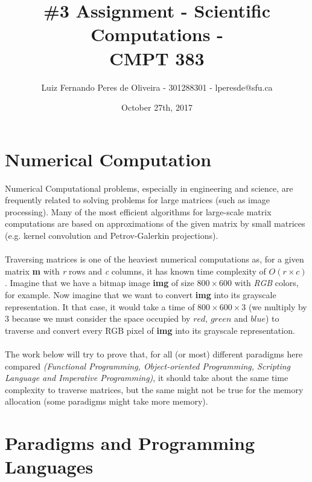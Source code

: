 \documentclass[conference]{IEEEtran}
\title{\#3 Assignment - Scientific Computations -\\ CMPT 383}
\author{Luiz Fernando Peres de Oliveira - 301288301 - lperesde@sfu.ca}
\date{October 27th, 2017}
\begin{document}
\maketitle

\section{Numerical Computation}
Numerical Computational problems, especially in engineering and science, are frequently related to solving problems for large matrices (such as image processing). Many of the most efficient algorithms for large-scale matrix computations are based on approximations of the given matrix by small matrices (e.g. kernel convolution and Petrov-Galerkin projections).
\\\\
Traversing matrices is one of the heaviest numerical computations as, for a given matrix \textbf{m} with \textit{r} rows and \textit{c} columns, it has known time complexity of $O(r\times c)$. Imagine that we have a bitmap image \textbf{img} of size $800 \times 600$ with \textit{RGB} colors, for example. Now imagine that we want to convert \textbf{img} into its grayscale representation.  It that case, it would take a time of $800 \times 600 \times 3$ (we multiply by 3 because we must consider the space occupied by $red$, $green$ and $blue$) to traverse and convert every RGB pixel of \textbf{img} into its grayscale representation.
\\\\
The work below will try to prove that, for all (or most) different paradigms here compared \textit{(Functional Programming, Object-oriented Programming, Scripting Language and Imperative Programming)}, it should take about the same time complexity to traverse matrices, but the same might not be true for the memory allocation (some paradigms might take more memory).
\section{Paradigms and Programming Languages}
\end{document}
